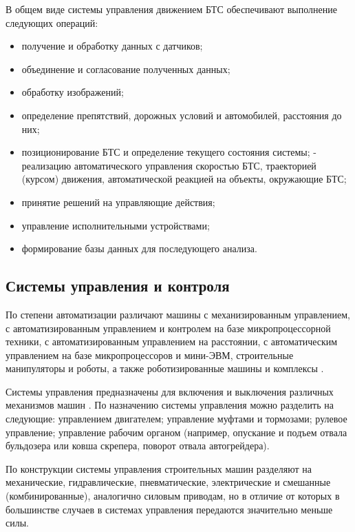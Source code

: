 В общем виде системы управления движением БТС обеспечивают выполнение следующих операций:

\begin{itemize}
    \item получение и обработку данных с датчиков;
    \item объединение и согласование полученных данных;
    \item обработку изображений;
    \item определение препятствий, дорожных условий и автомобилей, расстояния до них;
    \item позиционирование БТС и определение текущего состояния системы;
    - реализацию автоматического управления скоростью БТС, траекторией (курсом) движения, автоматической реакцией на объекты, окружающие БТС;
    \item принятие решений на управляющие действия;
    \item управление исполнительными устройствами;
    \item формирование базы данных для последующего анализа.
\end{itemize}

\subsection{Системы управления и контроля}\label{subsec:ch1/sec2/sub1}

По степени автоматизации различают машины с механизированным управлением, с автоматизированным управлением и контролем на базе микропроцессорной техники, с автоматизированным управлением на расстоянии, с автоматическим управлением на базе микропроцессоров и мини-ЭВМ, строительные манипуляторы и роботы, а также роботизированные машины и комплексы \cite[с.~39]{Evtukov}.

Системы управления предназначены для включения и выключения различных механизмов машин \cite[с.~109]{Evtukov}.
По назначению системы управления можно разделить на следующие: управлением двигателем; управление муфтами и тормозами; рулевое управление; управление рабочим органом (например, опускание и подъем отвала бульдозера или ковша скрепера, поворот отвала автогрейдера).

По конструкции системы управления строительных машин разделяют на механические, гидравлические, пневматические, электрические и смешанные (комбинированные), аналогично силовым приводам, но в отличие от которых в большинстве случаев в системах управления передаются значительно меньше силы.

